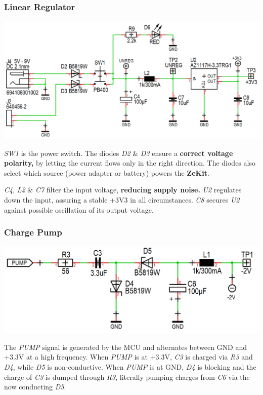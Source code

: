 \documentclass{scrartcl}
\begin{document}
\subsubsection{Linear Regulator}

\begin{center}
    \includegraphics[scale=0.4]{assets/schema-power.png}
\end{center}

\emph{SW1} is the power switch. The diodes \emph{D2} \& \emph{D3} ensure a \textbf{correct voltage polarity,} by letting the current flows only in the right direction. The diodes also select which source (power adapter or battery) powers the \textbf{ZeKit}.

\emph{C4}, \emph{L2} \& \emph{C7} filter the input voltage, \textbf{reducing supply noise.} \emph{U2} regulates down the input, assuring a stable +3V3 in all circumstances. \emph{C8} secures \emph{U2} against possible oscillation of its output voltage.

\subsubsection{Charge Pump}

\begin{center}
    \includegraphics[scale=0.3]{assets/schema-pump.png}
\end{center}

The \emph{PUMP} signal is generated by the MCU and alternates between GND and +3.3V at a high frequency. When \emph{PUMP} is at +3.3V, \emph{C3} is charged via \emph{R3} and \emph{D4}, while \emph{D5} is non-conductive. When \emph{PUMP} is at GND, \emph{D4} is blocking and the charge of \emph{C3} is dumped through \emph{R3}, literally pumping charges from \emph{C6} via the now conducting \emph{D5}.
\end{document}
